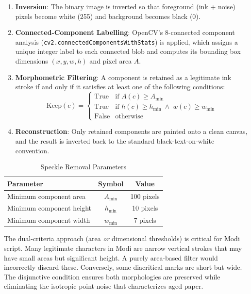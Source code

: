 \documentclass[12pt, a4paper]{article}
\begin{document}
\begin{enumerate}
    \item \textbf{Inversion}: The binary image is inverted so that foreground (ink + noise) pixels become white (255) and background becomes black (0).
    \item \textbf{Connected-Component Labelling}: OpenCV's 8-connected component analysis (\texttt{cv2.connectedComponentsWithStats}) is applied, which assigns a unique integer label to each connected blob and computes its bounding box dimensions $(x, y, w, h)$ and pixel area $A$.
    \item \textbf{Morphometric Filtering}: A component is retained as a legitimate ink stroke if and only if it satisfies at least one of the following conditions:
    \begin{equation}
        \text{Keep}(c) = \begin{cases}
            \text{True} & \text{if } A(c) \geq A_{\min} \\
            \text{True} & \text{if } h(c) \geq h_{\min} \;\wedge\; w(c) \geq w_{\min} \\
            \text{False} & \text{otherwise}
        \end{cases}
        \label{eq:speckle}
    \end{equation}
    \item \textbf{Reconstruction}: Only retained components are painted onto a clean canvas, and the result is inverted back to the standard black-text-on-white convention.
\end{enumerate}

\begin{table}[H]
\centering
\caption{Speckle Removal Parameters}
\label{tab:speckle_params}
\begin{tabular}{@{}lcc@{}}
\toprule
\textbf{Parameter} & \textbf{Symbol} & \textbf{Value} \\
\midrule
Minimum component area & $A_{\min}$ & 100 pixels \\
Minimum component height & $h_{\min}$ & 10 pixels \\
Minimum component width & $w_{\min}$ & 7 pixels \\
\bottomrule
\end{tabular}
\end{table}

The dual-criteria approach (area \emph{or} dimensional thresholds) is critical for Modi script. Many legitimate characters in Modi are narrow vertical strokes that may have small areas but significant height. A purely area-based filter would incorrectly discard these. Conversely, some diacritical marks are short but wide. The disjunctive condition ensures both morphologies are preserved while eliminating the isotropic point-noise that characterizes aged paper.
\end{document}
